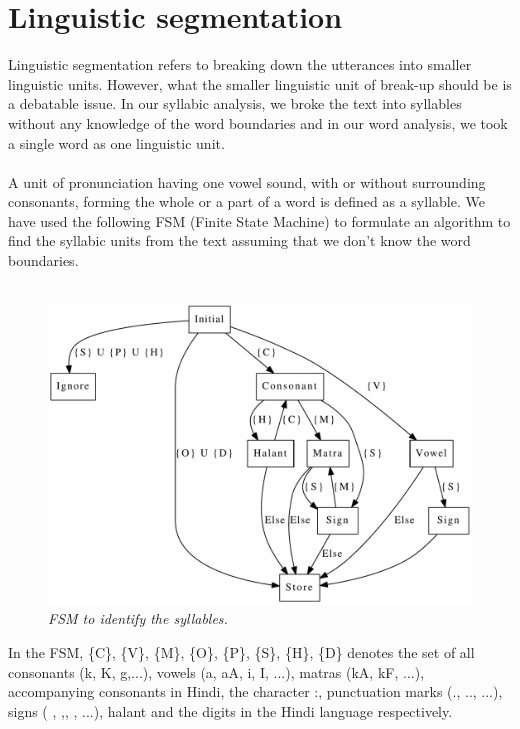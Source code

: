 \documentclass[12pt, a4paper]{report}
\begin{document}
\section{Linguistic segmentation}
Linguistic segmentation refers to breaking down the utterances into smaller linguistic units. However, what the smaller linguistic unit of break-up should be is a debatable issue. In our syllabic analysis, we broke the text into syllables without any knowledge of the word boundaries and in our word analysis, we took a single word as one linguistic unit.\\
\\
A unit of pronunciation having one vowel sound, with or without surrounding consonants, forming the whole or a part of a word is defined as a syllable. We have used the following FSM (Finite State Machine) to formulate an algorithm to find the syllabic units from the text assuming that we don’t know the word boundaries.\\
\\
\begin{figure}[h!] 
\begin{center} 
\includegraphics[scale=0.75]{FSM2.pdf} 
\caption{\small \sl FSM to identify the syllables.} 
\end{center} 
\end{figure}  
In the FSM, \{C\}, \{V\}, \{M\}, \{O\}, \{P\}, \{S\}, \{H\}, \{D\} denotes the set of all consonants ({\dn k}, {\dn K}, {\dn g},...), vowels ({\dn a}, {\dn aA}, {\dn i}, {\dn I}, ...), matras ({\dn kA}, {\dn kF}, ...), accompanying consonants in Hindi, the character {\dn :}, punctuation marks ({\dn .}, {\dn ..}, ...), signs ( {\dn \2}, {\dn ,}, {\dn \1}, ...), halant and the digits in the Hindi language respectively. 
\end{document}
